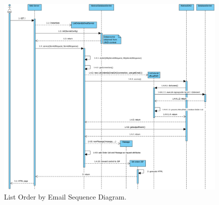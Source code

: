 \begin{figure}[h]
    \centering
    \includegraphics[width=\textwidth]{mockup/ListOrderByEmailSequenceDiagram}
    \caption{List Order by Email Sequence Diagram.}
    \label{fig:listorder}
\end{figure}